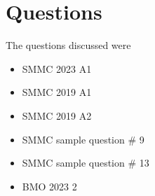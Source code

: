 \documentclass[]{article}
\begin{document}
\section{Questions}
The questions discussed were
\begin{itemize}
    \item SMMC 2023 A1
    \item SMMC 2019 A1
    \item SMMC 2019 A2
    \item SMMC sample question \# 9
    \item SMMC sample question \# 13
    \item BMO 2023 2
\end{itemize}
\end{document}
